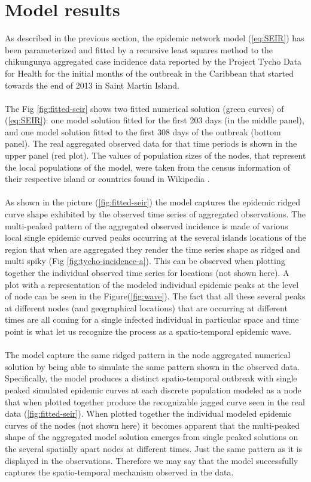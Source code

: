 \documentclass[10pt,a4paper]{article}
\begin{document}
\section*{Model results}
As described in the previous section, the epidemic network model (\ref{eq:SEIR}) has been parameterized and fitted by a recursive least squares method to the chikungunya aggregated case incidence data reported by the Project Tycho Data for Health \citep{TychoData} for the initial months of the outbreak in the Caribbean that started towards the end of 2013 in Saint Martin Island. 
\\\\
The Fig \ref{fig:fitted-seir} shows two fitted numerical solution (green curves) of (\ref{eq:SEIR}): one model solution fitted for the first 203 days (in the middle panel), and one model solution fitted to the first 308 days of the outbreak (bottom panel). The real aggregated observed data for that time periods is shown in the upper panel (red plot). 
%
The values of population sizes of the nodes, that represent the local populations of the model, were taken from the census information of their respective island or countries found in Wikipedia \citep{wiki:general}. 
%
\\\\
As shown in the picture (\ref{fig:fitted-seir}) the model captures the epidemic ridged curve shape exhibited by the observed time series of aggregated observations. 
%
The multi-peaked pattern of the aggregated observed incidence is made of various local single epidemic curved  peaks occurring at the several islands locations of the region that when are aggregated they render the time series shape as ridged and multi spiky (Fig \ref{fig:tycho-incidence-a}). This can be observed when plotting together the individual observed time series for locations (not shown here). A plot with a representation of the modeled individual epidemic peaks at the level  of node can be seen in the Figure(\ref{fig:wave}). 
%
The fact that all these several peaks at different nodes (and geographical locations) that are occurring at different times are all coming for a single infected individual in particular space and time point is what let us recognize the process as a spatio-temporal epidemic wave. 
%
\\\\
The model capture the same ridged pattern in the node aggregated numerical solution by being able to simulate the same pattern shown in the observed data. Specifically, the model produces a distinct spatio-temporal outbreak with single peaked simulated epidemic curves at each discrete population modeled as a node that when plotted together produce the recognizable jagged curve seen in the real data (\ref{fig:fitted-seir}). When plotted together the individual modeled epidemic curves of the nodes (not shown here) it becomes apparent that the multi-peaked shape of the aggregated model solution emerges from single peaked solutions on the several spatially apart nodes at different times. Just the same pattern  as it is displayed in the  observations. Therefore we may say that the model successfully captures the spatio-temporal mechanism observed in the data.   
\end{document}

